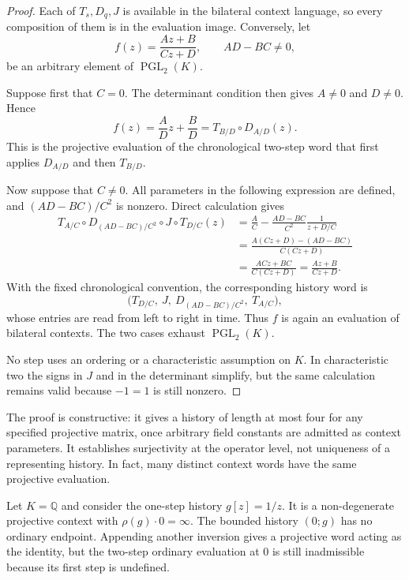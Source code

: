 \begin{proof}
Each of $T_s,D_q,J$ is available in the bilateral context language, so every
composition of them is in the evaluation image.  Conversely, let
\[
  f(z)=\frac{Az+B}{Cz+D},
  \qquad AD-BC\ne0,
\]
be an arbitrary element of $\operatorname{PGL}_2(K)$.

Suppose first that $C=0$.  The determinant condition then gives $A\ne0$ and
$D\ne0$.  Hence
\[
  f(z)=\frac{A}{D}z+\frac{B}{D}
      =T_{B/D}\circ D_{A/D}(z).
\]
This is the projective evaluation of the chronological two-step word that
first applies $D_{A/D}$ and then $T_{B/D}$.

Now suppose that $C\ne0$.  All parameters in the following expression are
defined, and $(AD-BC)/C^2$ is nonzero.  Direct calculation gives
\begin{align*}
  T_{A/C}\circ D_{(AD-BC)/C^2}\circ J\circ T_{D/C}(z)
  &=\frac{A}{C}
    -\frac{AD-BC}{C^2}\frac{1}{z+D/C}\\
  &=\frac{A(Cz+D)-(AD-BC)}{C(Cz+D)}\\
  &=\frac{ACz+BC}{C(Cz+D)}
   =\frac{Az+B}{Cz+D}.
\end{align*}
With the fixed chronological convention, the corresponding history word is
\[
  \bigl(T_{D/C},\ J,\ D_{(AD-BC)/C^2},\ T_{A/C}\bigr),
\]
whose entries are read from left to right in time.
Thus $f$ is again an evaluation of bilateral contexts.  The two cases exhaust
$\operatorname{PGL}_2(K)$.

No step uses an ordering or a characteristic assumption on $K$.  In
characteristic two the signs in $J$ and in the determinant simplify, but the
same calculation remains valid because $-1=1$ is still nonzero.
\end{proof}

The proof is constructive: it gives a history of length at most four for any
specified projective matrix, once arbitrary field constants are admitted as
context parameters.  It establishes surjectivity at the operator level, not
uniqueness of a representing history.  In fact, many distinct context words
have the same projective evaluation.

\begin{example}
Let $K=\mathbb Q$ and consider the one-step history $g[z]=1/z$.  It is a
non-degenerate projective context with $\rho(g)\cdot0=\infty$.  The bounded
history $(0;g)$ has no ordinary endpoint.  Appending another inversion gives a
projective word acting as the identity, but the two-step ordinary evaluation
at $0$ is still inadmissible because its first step is undefined.
\end{example}

